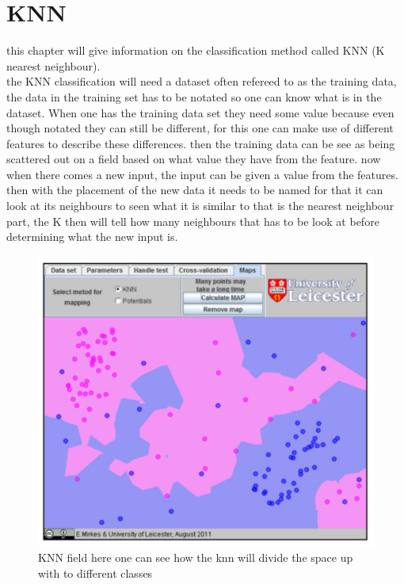 \section{KNN}
this chapter will give information on the classification method called KNN (K nearest neighbour).\\
the KNN classification will need a dataset often refereed to as the training data, the data in the training set has to be notated so one can know what is in the dataset. When one has the training data set they need some value because even though notated they can still be different, for this one can make use of different features to describe these differences. then the training data can be see as being scattered out on a field based on what value they have from the feature. now when there comes a new input, the input can be given a value from the features. then with the placement of the new data it needs to be named for that it can look at its neighbours to seen what it is similar to that is the nearest neighbour part, the K then will tell how many neighbours that has to be look at before determining what the new input is. 
\begin{figure}[h]
	\begin{center}
		\includegraphics[scale = 0.5]{fig/KNNfig.jpg}
		\caption{KNN field here one can see how the knn will divide the space up with to different classes}
		\label{KNN fig}
	\end{center}
\end{figure}